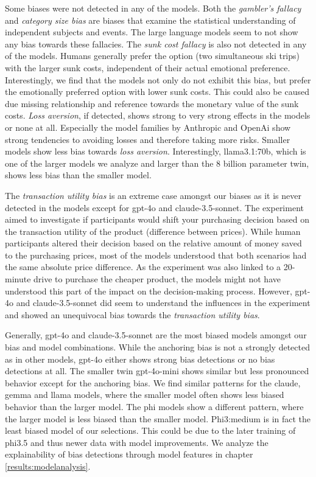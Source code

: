 \par Some biases were not detected in any of the models. Both the \textit{gambler's fallacy} and \textit{category size bias} are biases that examine the statistical understanding of independent subjects and events. The large language models seem to not show any bias towards these fallacies. The \textit{sunk cost fallacy} is also not detected in any of the models. Humans generally prefer the option (two simultaneous ski trips) with the larger sunk costs, independent of their actual emotional preference. Interestingly, we find that the models not only do not exhibit this bias, but prefer the emotionally preferred option with lower sunk costs. This could also be caused due missing relationship and reference towards the monetary value of the sunk costs. \textit{Loss aversion}, if detected, shows strong to very strong effects in the models or none at all. Especially the model families by Anthropic and OpenAi show strong tendencies to avoiding losses and therefore taking more risks. Smaller models show less bias towards \textit{loss aversion}. Interestingly, llama3.1:70b, which is one of the larger models we analyze and larger than the 8 billion parameter twin, shows less bias than the smaller model.

The \textit{transaction utility bias} is an extreme case amongst our biases as it is never detected in the models except for gpt-4o and claude-3.5-sonnet. The experiment aimed to investigate if participants would shift your purchasing decision based on the transaction utility of the product (difference between prices). While human participants altered their decision based on the relative amount of money saved to the purchasing prices, most of the models understood that both scenarios had the same absolute price difference. As the experiment was also linked to a 20-minute drive to purchase the cheaper product, the models might not have understood this part of the impact on the decision-making process. However, gpt-4o and claude-3.5-sonnet did seem to understand the influences in the experiment and showed an unequivocal bias towards the \textit{transaction utility bias}.

\par Generally, gpt-4o and claude-3.5-sonnet are the most biased models amongst our bias and model combinations. While the anchoring bias is not a strongly detected as in other models, gpt-4o either shows strong bias detections or no bias detections at all. The smaller twin gpt-4o-mini shows similar but less pronounced behavior except for the anchoring bias. We find similar patterns for the claude, gemma and llama models, where the smaller model often shows less biased behavior than the larger model. The phi models show a different pattern, where the larger model is less biased than the smaller model. Phi3:medium is in fact the least biased model of our selections. This could be due to the later training of phi3.5 and thus newer data with model improvements. We analyze the explainability of bias detections through model features in chapter \ref{results:modelanalysis}.


